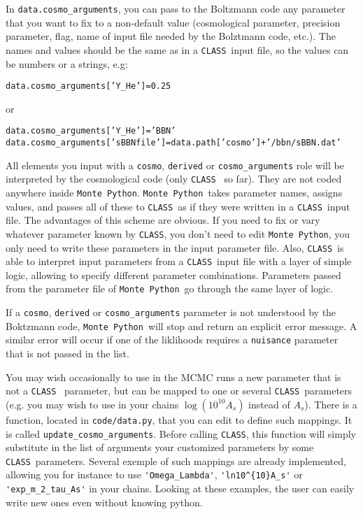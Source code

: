 \documentclass[10pt]{article}
\newcommand{\CLASS}{\texttt{CLASS}}
\newcommand{\MP}{\texttt{Monte Python}}
\begin{document}
  In  \verb?data.cosmo_arguments?, you can pass to the Boltzmann code any parameter that you want to fix to a non-default value (cosmological parameter, precision parameter, flag, name of input file needed by the Bolztmann code, etc.). The names and values should be the same as in a \CLASS~input file, so the values can be numbers or a strings, e.g:
  \begin{alltt}
    data.cosmo_arguments['Y_He']           = 0.25
    \end{alltt}  
    or
  \begin{alltt}
    data.cosmo_arguments['Y_He']           = 'BBN'    
    data.cosmo_arguments['sBBN file'] = data.path['cosmo']+'/bbn/sBBN.dat'
    \end{alltt}
  
  All elements you input with a \verb?cosmo?, \verb?derived? or \verb?cosmo_arguments? role will
  be interpreted by the cosmological code (only \CLASS~ so far). They are not coded anywhere inside \MP. \MP~takes parameter names, assigns values, and passes all of these to \CLASS~as if they were written in a \CLASS~input file. The advantages of this scheme are obvious. If you need to fix or vary whatever parameter known by \CLASS, you don't need to edit \MP, you only need to write these parameters in the input parameter file. Also, \CLASS~is able to interpret input parameters from a \CLASS~input file with a layer of simple logic, allowing to specify different parameter combinations. Parameters passed from the parameter file of \MP~go through the same layer of logic. 
  
  If a \verb?cosmo?, \verb?derived? or \verb?cosmo_arguments? parameter is not understood by the Boktzmann code, \MP~will stop and return an explicit error message. A similar error will occur if one of the liklihoods requires a \verb?nuisance? parameter that is not passed in the list.

  You may wish occasionally to use in the MCMC runs a new parameter that is not a \CLASS~ parameter, but can be mapped to one or several \CLASS~parameters (e.g. you may wish to use in your chains $\log(10^{10}A_s)$ instead of $A_s$). There is a function, located in \verb?code/data.py?, that you can edit to define such mappings. It is called  \verb?update_cosmo_arguments?. Before calling \CLASS, this function will simply substitute in the list of arguments your customized parameters by some \CLASS~parameters. Several exemple of such mappings are already implemented, allowing you for instance to use 
\verb?'Omega_Lambda'?, \verb?'ln10^{10}A_s'? or \verb?'exp_m_2_tau_As'? in your chains. Looking at these examples, the user can easily write new ones even without knowing python.
  
\end{document}
